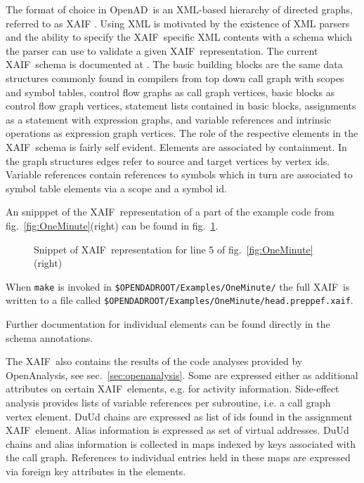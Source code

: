 \documentclass{book}
\newcommand{\OpenAD}{OpenAD}
\newcommand{\OpenAnalysis}{OpenAnalysis}
\newcommand{\xaif}{XAIF}
\newcommand{\refsec}[1]{{sec.~\ref{#1}}}
\newcommand{\reffig}[1]{{fig.~\ref{#1}}}
\begin{document}
The format of choice in \OpenAD\ is an XML-based \cite{xmlWeb} hierarchy of 
directed graphs, referred to as \xaif 
\cite{Hovland2002AXB}. Using XML is motivated by the existence of XML parsers and 
the ability to specify the \xaif\ specific XML contents with a schema which 
the parser can use to validate a given \xaif\ representation. 
The current \xaif\ schema is documented at \cite{xaifweb}.
The basic building blocks are the same data structures commonly found 
in compilers from top down call graph with scopes and symbol tables, 
control flow graphs as call graph vertices, basic blocks  as control flow 
graph vertices, statement lists contained in basic blocks, 
assignments as a statement with expression graphs,  and variable references 
and intrinsic operations as expression graph vertices. 
The role of the respective elements in the \xaif\ schema is fairly self evident. 
Elements are associated by containment. In the graph structures edges 
refer to source and target vertices by vertex ids. 
Variable references contain references to symbols which in turn 
are associated to symbol table elements via a scope and a symbol id. 

An snipppet of the \xaif\ representation of a part of the 
example code  from \reffig{fig:OneMinute}(right) can be found in  
\reffig{fig:wtxxtwXaif}. 
\begin{figure}[h]
\small
{}

  \caption{Snippet of \xaif\ representation for line 5 of \reffig{fig:OneMinute}(right)}\label{fig:wtxxtwXaif}
\end{figure}
When \lstinline{make} is invoked in \lstinline{$OPENDADROOT/Examples/OneMinute/}%
the full \xaif\ is written to a file called \lstinline{$OPENDADROOT/Examples/OneMinute/head.preppef.xaif}.%

Further documentation for individual elements can be found directly in the 
schema annotations. 

The \xaif\ also contains the results of the code analyses provided 
by \OpenAnalysis, see \refsec{sec:openanalysis}. Some are expressed 
either as additional attributes on certain \xaif\ elements, e.g. for activity information. 
Side-effect analysis provides lists of variable references per subroutine, i.e. a call graph vertex element.
DuUd chains are expressed as list of ids found in the assignment \xaif\ element.
Alias information is expressed as set of virtual addresses. 
DuUd chains and alias information is collected in maps indexed by keys associated with the call 
graph. References to individual entries held in these maps are expressed via foreign key 
attributes in the elements. 
\end{document}
